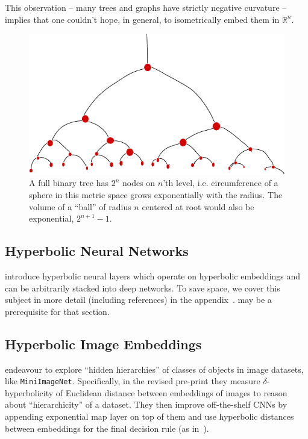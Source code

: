 This observation -- many trees and graphs have strictly negative curvature --
implies that one couldn't hope, in general, to isometrically embed them in \(
\mathbb{R}^n \).

\begin{figure}[ht]\center
    \includegraphics[width=.9\textwidth]{art/binary-tree-circumference-min.pdf}
    \caption{A full binary tree has \( 2^n \) nodes on \( n \)'th level, i.e.
    circumference of a sphere in this metric space grows exponentially with the
    radius. The volume of a ``ball'' of radius \( n \) centered at root would
    also be exponential, \( 2^{n+1} - 1 \).}
    \label{fig:binaryTreeCircumference}
\end{figure}

\subsection*{Hyperbolic Neural Networks}

\citet{ganeaHNNs} introduce hyperbolic neural layers which operate on
hyperbolic embeddings and can be arbitrarily stacked into deep networks.  To
save space, we cover this subject in more detail (including references) in the
appendix~.  may be
a prerequisite for that section.

\subsection*{Hyperbolic Image Embeddings}

\citet{khrulkov} endeavour to explore ``hidden hierarchies'' of classes of
objects in image datasets, like \texttt{MiniImageNet}. Specifically, in the
revised pre-print they measure \( \delta \)-hyperbolicity of Euclidean distance
between embeddings of images to reason about ``hierarchicity'' of a dataset.
They then improve off-the-shelf CNNs by appending exponential map layer on top
of them and use hyperbolic distances between embeddings for the final
decision rule (as in~\citet{snell2017protonet}).


